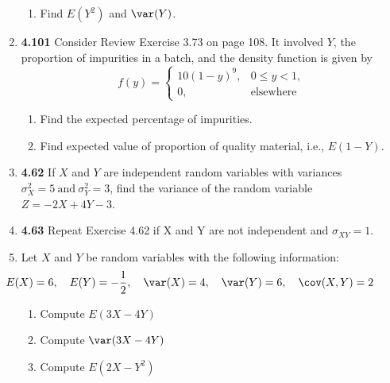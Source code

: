 \documentclass[basic, header]{nosvagor-notes}
\begin{document}
\begin{enumerate}[leftmargin=1.5em, itemsep=2em]
\begin{enumerate}[leftmargin=1.6em]
      \item Find \(E(Y^2)\) and \(\var(Y)\).

    \end{enumerate}

  \item \textbf{4.101} Consider Review Exercise 3.73 on page 108. It
    involved \(Y\), the proportion of impurities in a batch, and the density
    function is given by
    \[%
      f(y) =
      \begin{cases}
        10(1-y)^9,			& 0 \leq y < 1, \\
        0, & \text{elsewhere}
      \end{cases}
    \]%
    \begin{enumerate}[leftmargin=1.6em]

      \item Find the expected percentage of impurities.

      \item Find expected value of proportion of quality material, i.e.,
        \(E(1-Y)\).

    \end{enumerate}

  \newpage %

  \item \textbf{4.62} If \(X\) and \(Y\) are independent random variables with
    variances \(\sigma^2_X = 5 ~\text{and}~ \sigma^2_Y = 3\), find the variance
    of the random variable \(Z = -2X + 4Y - 3\).

  \item \textbf{4.63} Repeat Exercise 4.62 if X and Y are not independent and
    \(\sigma_{XY} = 1\).

  \item Let \(X\) and \(Y\) be random variables with the following information:
    \[%
     \hspace{-4em} E(X) = 6, \quad E(Y) = -\frac{1}{2}, \quad \var(X) = 4, \quad \var(Y) = 6, \quad \cov(X,Y) = 2
    \]%
    \begin{enumerate}[leftmargin=1.6em]

      \item Compute \(E(3X - 4Y)\)
      \item Compute \(\var(3X - 4Y)\)
      \item Compute \(E(2X - Y^2)\)


\end{enumerate}
\end{enumerate}
\end{document}
